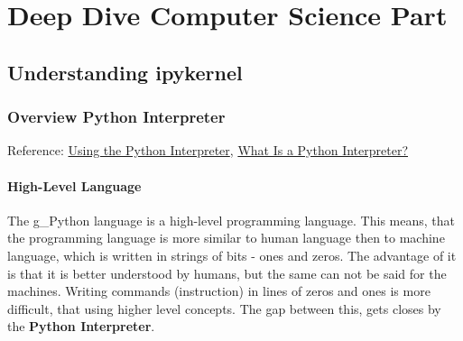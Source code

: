 
\section{Deep Dive Computer Science Part}
\subsection{Understanding ipykernel}
\subsubsection{Overview Python Interpreter}
Reference: \href{https://docs.python.org/3/tutorial/interpreter.html#the-interpreter-and-its-environment}{Using the Python Interpreter}, \href{https://blog.hubspot.com/website/what-is-python-interpreter#:~:text=A%20python%20interpreter%20is%20a,and%20low%2Dlevel%20languages%20are.}{What Is a Python Interpreter?}\\


\paragraph{High-Level Language}
The \gls{g_Python} language is a high-level programming language. This means, that the programming language is more similar to human language then to machine language, which is written in strings of bits - ones and zeros.
The advantage of it is that it is better understood by humans, but the same can not be said for the machines. Writing commands (instruction) in lines of zeros and ones is more difficult, that using higher level concepts. The gap between this, gets closes by the \textbf{Python Interpreter}.\\

